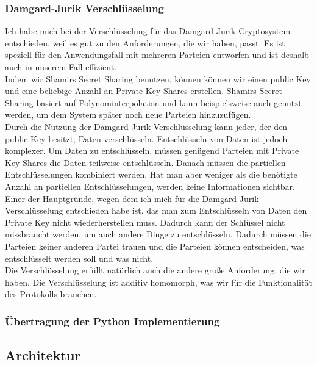 \documentclass[a4paper,10pt]{scrartcl}
\begin{document}
\subsubsection{Damgard-Jurik Verschlüsselung}
Ich habe mich bei der Verschlüsselung für das Damgard-Jurik Cryptosystem entschieden, weil es gut zu den Anforderungen, die wir haben, passt. Es ist speziell für den Anwendungsfall mit mehreren Parteien entworfen und ist deshalb auch in unserem Fall effizient.\\
Indem wir Shamirs Secret Sharing benutzen, können können wir einen public Key und eine beliebige Anzahl an Private Key-Shares erstellen. Shamirs Secret Sharing basiert auf Polynominterpolation und kann beispielsweise auch genutzt werden, um dem System später noch neue Parteien hinzuzufügen.\cite{Shamir1979}\\
Durch die Nutzung der Damgard-Jurik Verschlüsselung kann jeder, der den public Key besitzt, Daten verschlüsseln. Entschlüsseln von Daten ist jedoch komplexer. Um Daten zu entschlüsseln, müssen genügend Parteien mit Private Key-Shares die Daten teilweise entschlüsseln. Danach müssen die partiellen Entschlüsselungen kombiniert werden. Hat man aber weniger als die benötigte Anzahl an partiellen Entschlüsselungen, werden keine Informationen sichtbar. \cite{IvanDamgard2004}\\
Einer der Hauptgründe, wegen dem ich mich für die Damgard-Jurik-Verschlüsselung entschieden habe ist, das man zum Entschlüsseln von Daten den Private Key nicht wiederherstellen muss. Dadurch kann der Schlüssel nicht missbraucht werden, um auch andere Dinge zu entschlüsseln. Dadurch müssen die Parteien keiner anderen Partei trauen und die Parteien können entscheiden, was entschlüsselt werden soll und was nicht. \cite{IvanDamgard2004}\\
Die Verschlüsselung erfüllt natürlich auch die andere große Anforderung, die wir haben. Die Verschlüsselung ist additiv homomorph, was wir für die Funktionalität des Protokolls brauchen. \cite{IvanDamgard2004}

\subsubsection{Übertragung der Python Implementierung}

\subsection{Architektur}
\end{document}
